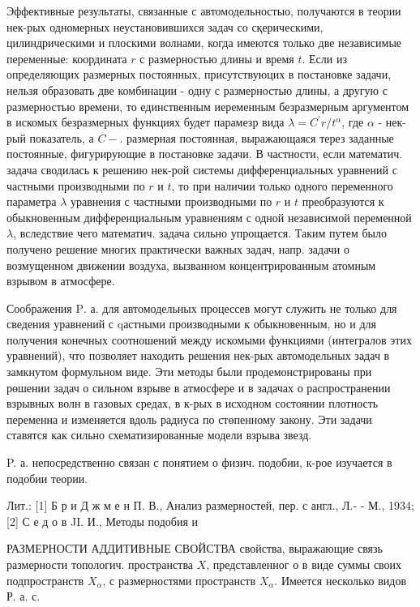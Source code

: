 \documentclass[10pt]{article}
\begin{document}
Эффективные результаты, связанные с автомодельностыо, получаются в теории нек-рых одномерных неустановившихся задач со сқерическими, цилиндрическими и плоскими волнами, когда имеются только две независимые переменные: координата $r$ с размерностью длины и время $t$. Если из определяющих размерных постоянных, присутствуюцих в постановке задачи, нельзя образовать две комбинации - одну с размерностью длины, а другую с размерностью времени, то единственным иеременным безразмерным аргументом в искомых безразмерных функциях будет парамезр вида $\lambda=C^{\prime} r / t^{\alpha}$, где $\alpha$ - нек-рый показатель, а $C-$. размерная постоянная, выражающаяся терез заданные постоянные, фигурирующие в постановке задачи. В частности, если математич. задача сводилась к решению нек-рой системы дифференциальных уравнений с частными производными по $r$ и $t$, то при наличии только одного переменного параметра $\lambda$ уравнения с частными производными по $r$ и $t$ преобразуются к обыкновенным дифференциальным уравнениям с одной независимой переменной $\lambda$, вследствие чего математич. задача сильно упрощается. Таким путем было получено решение многих практически важных задач, напр. задачи о возмущенном движении воздуха, вызванном концентрированным атомным взрывом в атмосфере.



Соображения $\mathrm{P}$. а. для автомодельных процессев могут служить не только для сведения уравнений с qастными производными к обыкновенным, но и для получения конечных соотношений между искомыми функциями (интегралов этих уравнений), что позволяет находить решения нек-рых автомодельных задач в замкнутом формульном виде. Эти методы были продемонстрированы при рөшении задач о сильном взрыве в атмосфере и в задачах о распространении взрывных волн в газовых средах, в к-рых в исходном состоянии плотность переменна и изменяется вдоль радиуса по стөпенному закону. Эти задачи ставятся как сильно схематизированные модели взрыва звезд.



P. а. непосредственно связан с понятием о физич. подобии, к-рое изучается в подобии теории.



Лит.: [1] Б р и Д ж м е н П. В., Анализ размерностей, пер. с англ., Л.- - М., 1934; [2] С е д о в JI. И., Методы подобия и



РАЗМЕРНОСТИ АДДИТИВНЫЕ СВОЙСТВА свойства, выражающие связь размерности топологич. пространства $X$, представленног о в виде суммы своих подпространств $X_{\alpha}$, с размерностями пространств $X_{\alpha}$. Имеется несколько видов Р. а. с.
\end{document}
